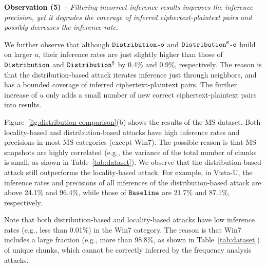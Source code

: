 \documentclass[bachelor]{thesis-uestc}
\begin{document}

{\bf Observation (5) --} {\em Filtering incorrect inference results improves
the inference precision, yet it degrades the coverage of inferred
ciphertext-plaintext pairs and possibly decreases the inference rate.
} 

We further observe that although $\tt Distribution$-$\tt o$ and $\tt
Distribution^S$-$\tt o$ build on larger $u$, their inference rates are just
slightly higher than those of $\tt Distribution$ and $\tt Distribution^S$ by
0.4\% and 0.9\%, respectively. The reason is that the distribution-based
attack iterates inference just through neighbors, and has a bounded coverage
of inferred ciphertext-plaintext pairs. The further increase of $u$ only adds
a small number of new correct  ciphertext-plaintext pairs into results. 

Figure~\ref{fig:distribution-comparison}(b) shows the
results of the MS dataset. Both locality-based and distribution-based attacks
have high inference rates and precisions in most MS categories (except Win7).
The possible reason is that MS snapshots are highly correlated (e.g., the
variance of the total number of chunks is small, as shown in
Table~\ref{tab:dataset}).  We observe that the distribution-based attack still
outperforms the locality-based attack. For example, in Vista-U, the inference
rates and precisions of all inferences of the distribution-based attack are
above 24.1\% and 96.4\%, while those of $\tt Baseline$ are 21.7\% and 87.1\%,
respectively. 

Note that both  distribution-based and  locality-based attacks have low
inference rates (e.g., less than 0.01\%) in the Win7 category. The reason is
 that Win7 includes a large fraction (e.g., more than 98.8\%, as shown in
Table~\ref{tab:dataset}) of unique chunks, which cannot be correctly
inferred by the frequency analysis attacks. 

\end{document}
